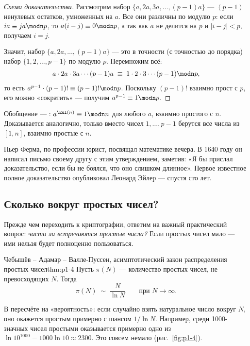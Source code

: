 \begin{proof}[Схема доказательства]
Рассмотрим набор $\{a, 2a, 3a, \ldots, (p-1)a\}$ --- $(p-1)$ ненулевых остатков, умноженных на $a$. Все они различны по модулю $p$: если $ia \equiv ja \modn p$, то $a(i-j) \equiv 0 \modn p$, а так как $a$ не делится на $p$ и $|i-j| < p$, получаем $i = j$.

Значит, набор $\{a, 2a, \ldots, (p-1)a\}$ --- это в точности (с точностью до порядка) набор $\{1, 2, \ldots, p-1\}$ по модулю $p$. Перемножим всё:
\[
a\cdot 2a\cdot 3a \cdots (p-1)a \;\equiv\; 1\cdot 2\cdot 3\cdots(p-1) \modn p,
\]
то есть $a^{p-1}\cdot (p-1)! \equiv (p-1)! \modn p$. Поскольку $(p-1)!$ взаимно прост с $p$, его можно «сократить» --- получим $a^{p-1} \equiv 1 \modn p$. \qedhere
\end{proof}

Обобщение --- : $a^{\Eul(n)} \equiv 1 \modn n$ для любого $a$, взаимно простого с $n$. Доказывается аналогично, только вместо чисел $1, \ldots, p-1$ берутся все числа из $[1,n]$, взаимно простые с $n$.

\begin{interestbox}
Пьер Ферма, по профессии юрист, посвящал математике вечера. В 1640 году он написал письмо своему другу с этим утверждением, заметив: «Я бы прислал доказательство, если бы не боялся, что оно слишком длинное». Первое известное полное доказательство опубликовал Леонард Эйлер --- спустя сто лет.
\end{interestbox}

\subsection{Сколько вокруг простых чисел?}

Прежде чем переходить к криптографии, ответим на важный практический вопрос: \emph{часто ли встречаются простые числа?} Если простых чисел мало --- ими нельзя будет полноценно пользоваться.

\begin{theorem}{Чебышёв -- Адамар -- Валле-Пуссен, асимптотический закон распределения простых чисел}{thm:p1-4}
Пусть $\pi(N)$ --- количество простых чисел, не превосходящих $N$. Тогда
\[
\pi(N) \;\sim\; \frac{N}{\ln N} \qquad \text{при } N \to \infty.
\]
\end{theorem}

\noindent
В пересчёте на «вероятность»: если случайно взять натуральное число вокруг $N$, оно окажется простым примерно с шансом $1/\ln N$. Например, среди 1000-значных чисел простыми оказывается примерно одно из $\ln 10^{1000} = 1000\ln 10 \approx 2300$. Это совсем немало (рис.~\ref{fig:p1-4}).

